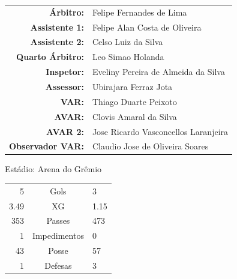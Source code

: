 \documentclass[11pt]{article}
\newcommand{\teamjersey}{}
\begin{document}
\vspace{0.5cm}
\begin{minipage}{0.65\textwidth}
\begin{center}
\begin{tabular}{rl}
\textbf{Árbitro:} & Felipe Fernandes de Lima \\
\textbf{Assistente 1:} & Felipe Alan Costa de Oliveira \\
\textbf{Assistente 2:} & Celso Luiz da Silva \\
\textbf{Quarto Árbitro:} & Leo Simao Holanda \\
\textbf{Inspetor:} & Eveliny Pereira de Almeida da Silva \\
\textbf{Assessor:} & Ubirajara Ferraz Jota \\
\textbf{VAR:} & Thiago Duarte Peixoto \\
\textbf{AVAR:} & Clovis Amaral da Silva \\
\textbf{AVAR 2:} & Jose Ricardo Vasconcellos Laranjeira \\
\textbf{Observador VAR:} & Claudio Jose de Oliveira Soares \\
\end{tabular}
\end{center}
\end{minipage}
\begin{minipage}{0.3\textwidth}
Estádio: Arena do Grêmio\\
\begin{tabular}{rcl}
5 & Gols & 3 \\
3.49 & XG & 1.15 \\
353 & Passes & 473 \\
1 & Impedimentos & 0 \\
43 & Posse & 57 \\
1 & Defesas & 3 \\
\end{tabular}
\end{minipage}
\newpage
\vspace{0.5cm}
\renewcommand{\teamjersey}{../assets/camisa/costas1.png}
\end{document}
